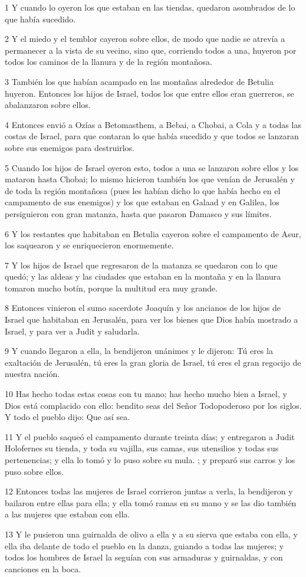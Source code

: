 \par 1 Y cuando lo oyeron los que estaban en las tiendas, quedaron asombrados de lo que había sucedido.
\par 2 Y el miedo y el temblor cayeron sobre ellos, de modo que nadie se atrevía a permanecer a la vista de su vecino, sino que, corriendo todos a una, huyeron por todos los caminos de la llanura y de la región montañosa.
\par 3 También los que habían acampado en las montañas alrededor de Betulia huyeron. Entonces los hijos de Israel, todos los que entre ellos eran guerreros, se abalanzaron sobre ellos.
\par 4 Entonces envió a Ozías a Betomasthem, a Bebai, a Chobai, a Cola y a todas las costas de Israel, para que contaran lo que había sucedido y que todos se lanzaran sobre sus enemigos para destruirlos.
\par 5 Cuando los hijos de Israel oyeron esto, todos a una se lanzaron sobre ellos y los mataron hasta Chobai; lo mismo hicieron también los que venían de Jerusalén y de toda la región montañosa (pues les habían dicho lo que había hecho en el campamento de sus enemigos) y los que estaban en Galaad y en Galilea, los persiguieron con gran matanza, hasta que pasaron Damasco y sus límites.
\par 6 Y los restantes que habitaban en Betulia cayeron sobre el campamento de Asur, los saquearon y se enriquecieron enormemente.
\par 7 Y los hijos de Israel que regresaron de la matanza se quedaron con lo que quedó; y las aldeas y las ciudades que estaban en la montaña y en la llanura tomaron mucho botín, porque la multitud era muy grande.
\par 8 Entonces vinieron el sumo sacerdote Joaquín y los ancianos de los hijos de Israel que habitaban en Jerusalén, para ver los bienes que Dios había mostrado a Israel, y para ver a Judit y saludarla.
\par 9 Y cuando llegaron a ella, la bendijeron unánimes y le dijeron: Tú eres la exaltación de Jerusalén, tú eres la gran gloria de Israel, tú eres el gran regocijo de nuestra nación.
\par 10 Has hecho todas estas cosas con tu mano; has hecho mucho bien a Israel, y Dios está complacido con ello: bendito seas del Señor Todopoderoso por los siglos. Y todo el pueblo dijo: Que así sea.
\par 11 Y el pueblo saqueó el campamento durante treinta días; y entregaron a Judit Holofernes su tienda, y toda su vajilla, sus camas, sus utensilios y todas sus pertenencias; y ella lo tomó y lo puso sobre su mula. ; y preparó sus carros y los puso sobre ellos.
\par 12 Entonces todas las mujeres de Israel corrieron juntas a verla, la bendijeron y bailaron entre ellas para ella; y ella tomó ramas en su mano y se las dio también a las mujeres que estaban con ella.
\par 13 Y le pusieron una guirnalda de olivo a ella y a su sierva que estaba con ella, y ella iba delante de todo el pueblo en la danza, guiando a todas las mujeres; y todos los hombres de Israel la seguían con sus armaduras y guirnaldas, y con canciones en la boca.

